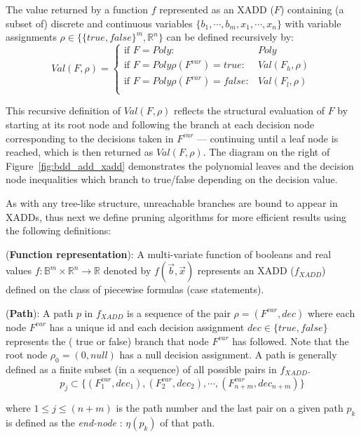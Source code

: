 \documentclass[twoside,11pt]{article}
\newenvironment{mydef}[1][Definition]{\begin{trivlist}
\item[\hskip \labelsep {\bfseries #1}]}{\end{trivlist}}
\begin{document}
The value returned by a function $f$ represented as an XADD ($F$) containing (a subset of) discrete and continuous variables $\{ b_1,\cdots,b_m, x_1,\cdots, x_n \}$ with variable assignments $\rho \in \lbrace \lbrace\mathit{true}, \mathit{false} \rbrace^m,\mathbb{R}^n \rbrace$ can be defined recursively by:
\begin{equation*}
Val(F,\rho) = \left\{
\begin{array}{lll}
\textrm{if } F=\mathit{Poly} :&\mathit{Poly}\\
\textrm{if } F = \mathit{Poly} \rho(F^{var})=\mathit{true}: & \mathit{Val} (F_h,\rho)\\
\textrm{if } F = \mathit{Poly}  \rho(F^{var})=\mathit{false}: & \mathit{Val} (F_l,\rho)\\
\end{array} \right. 
\end{equation*}

This recursive definition of $Val(F,\rho)$ reflects the structural
evaluation of $F$ by starting at its root node and following
the branch at each decision node corresponding to the decisions taken
in $F^{var}$ --- continuing until a leaf node is reached,
which is then returned as $Val(F,\rho)$. The diagram on the right of Figure~\ref{fig:bdd_add_xadd} demonstrates the polynomial leaves and the decision node inequalities which branch to true/false depending on the decision value.

As with any tree-like structure, unreachable branches are bound to appear in XADDs, thus next we define pruning algorithms for more efficient results using the following definitions:

\begin{mydef}(\textbf{Function representation}):
A multi-variate function of booleans and real values $ f:\mathbb{B}^m \times \mathbb{R}^n \rightarrow \mathbb{R}$ denoted by $f(\vec{b},\vec{x})$  represents an XADD ($f_{XADD}$) defined on the class of piecewise formulas (case statements).
\end{mydef}

\begin{mydef}(\textbf{Path}):
A path $p$ in $f_{XADD}$ is a sequence of the pair $\rho=(F^{var},\mathit{dec})$ where each node  $F^{var}$ has a unique id and each decision assignment $\mathit{dec} \in \lbrace \mathit{true},\mathit{false}\rbrace$ represents the ( true or false) branch that node $F^{var}$ has followed. Note that the root node $\rho_0=(0,null)$ has a null decision assignment. A path is generally defined as a finite subset (in a sequence) of all possible pairs in $f_{XADD}$.
\begin{equation*}
p_j \subset \lbrace (F_1^{var},\mathit{dec_1}), (F_2^{var},\mathit{dec_2}), \cdots, (F_{n+m}^{var},\mathit{dec_{n+m}}) \rbrace
\end{equation*}
\end{mydef}
where $1 \leq j \leq (n+m)$ is the path number and the last pair on a given path $p_k$ is defined as the \textit{end-node} : $\eta(p_k)$ of that path.
\end{document}

